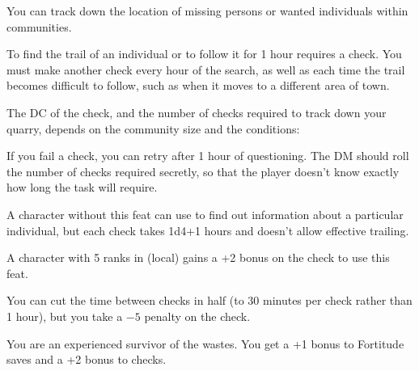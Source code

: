 {You can track down the location of missing persons or wanted individuals within communities.}{}
{
To find the trail of an individual or to follow it for 1 hour requires a  check. You must make another  check every hour of the search, as well as each time the trail becomes difficult to follow, such as when it moves to a different area of town.


The DC of the check, and the number of checks required to track down your quarry, depends on the community size and the conditions:

If you fail a  check, you can retry after 1 hour of questioning. The DM should roll the number of checks required secretly, so that the player doesn't know exactly how long the task will require.

}
{A character without this feat can use  to find out information about a particular individual, but each check takes 1d4+1 hours and doesn't allow effective trailing.}
{A character with 5 ranks in  (local) gains a +2 bonus on the  check to use this feat.

You can cut the time between  checks in half (to 30 minutes per check rather than 1 hour), but you take a $-5$ penalty on the check.}

{You are an experienced survivor of the wastes.}{}
{You get a +1 bonus to Fortitude saves and a +2 bonus to  checks.}{}{}

